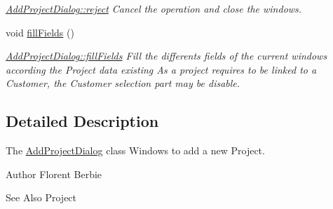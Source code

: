 \begin{DoxyCompactItemize}
\begin{DoxyCompactList}\small\item\em \hyperlink{classGui_1_1Dialogs_1_1AddProjectDialog_a767dcea1ae96d2efc3085f8ade4406ce}{Add\-Project\-Dialog\-::reject} Cancel the operation and close the windows. \end{DoxyCompactList}\item 
\hypertarget{classGui_1_1Dialogs_1_1AddProjectDialog_af31b6ed23acdd5fb8b71caaeddce34f4}{void \hyperlink{classGui_1_1Dialogs_1_1AddProjectDialog_af31b6ed23acdd5fb8b71caaeddce34f4}{fill\-Fields} ()}\label{classGui_1_1Dialogs_1_1AddProjectDialog_af31b6ed23acdd5fb8b71caaeddce34f4}

\begin{DoxyCompactList}\small\item\em \hyperlink{classGui_1_1Dialogs_1_1AddProjectDialog_af31b6ed23acdd5fb8b71caaeddce34f4}{Add\-Project\-Dialog\-::fill\-Fields} Fill the differents fields of the current windows according the Project data existing As a project requires to be linked to a Customer, the Customer selection part may be disable. \end{DoxyCompactList}\end{DoxyCompactItemize}


\subsection{Detailed Description}
The \hyperlink{classGui_1_1Dialogs_1_1AddProjectDialog}{Add\-Project\-Dialog} class Windows to add a new Project. 

\begin{DoxyAuthor}{Author}
Florent Berbie 
\end{DoxyAuthor}
\begin{DoxySeeAlso}{See Also}
Project 
\end{DoxySeeAlso}


